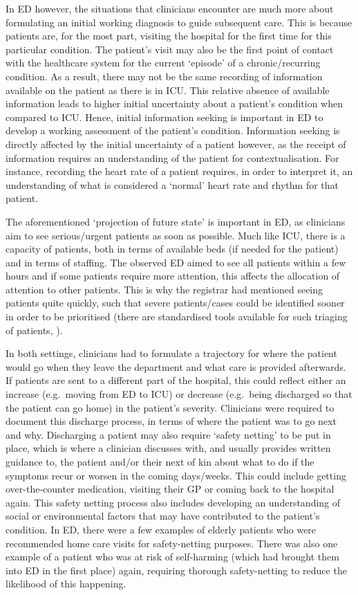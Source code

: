 \documentclass[a4paper, nobind]{templates/ociamthesis}
\begin{document}
\hfill\break
In ED however, the situations that clinicians encounter are much more about formulating an initial working diagnosis to guide subsequent care. This is because patients are, for the most part, visiting the hospital for the first time for this particular condition. The patient's visit may also be the first point of contact with the healthcare system for the current `episode' of a chronic/recurring condition. As a result, there may not be the same recording of information available on the patient as there is in ICU. This relative absence of available information leads to higher initial uncertainty about a patient's condition when compared to ICU. Hence, initial information seeking is important in ED to develop a working assessment of the patient's condition. Information seeking is directly affected by the initial uncertainty of a patient however, as the receipt of information requires an understanding of the patient for contextualisation. For instance, recording the heart rate of a patient requires, in order to interpret it, an understanding of what is considered a `normal' heart rate and rhythm for that patient.

\hfill\break
The aforementioned `projection of future state' is important in ED, as clinicians aim to see serious/urgent patients as soon as possible. Much like ICU, there is a capacity of patients, both in terms of available beds (if needed for the patient) and in terms of staffing. The observed ED aimed to see all patients within a few hours and if some patients require more attention, this affects the allocation of attention to other patients. This is why the registrar had mentioned seeing patients quite quickly, such that severe patients/cases could be identified sooner in order to be prioritised (there are standardised tools available for such triaging of patients, \textcite{noauthor_about_2024}).

\hfill\break
In both settings, clinicians had to formulate a trajectory for where the patient would go when they leave the department and what care is provided afterwards. If patients are sent to a different part of the hospital, this could reflect either an increase (e.g.~moving from ED to ICU) or decrease (e.g.~being discharged so that the patient can go home) in the patient's severity. Clinicians were required to document this discharge process, in terms of where the patient was to go next and why. Discharging a patient may also require `safety netting' to be put in place, which is where a clinician discusses with, and usually provides written guidance to, the patient and/or their next of kin about what to do if the symptoms recur or worsen in the coming days/weeks. This could include getting over-the-counter medication, visiting their GP or coming back to the hospital again. This safety netting process also includes developing an understanding of social or environmental factors that may have contributed to the patient's condition. In ED, there were a few examples of elderly patients who were recommended home care visits for safety-netting purposes. There was also one example of a patient who was at risk of self-harming (which had brought them into ED in the first place) again, requiring thorough safety-netting to reduce the likelihood of this happening.
\end{document}
